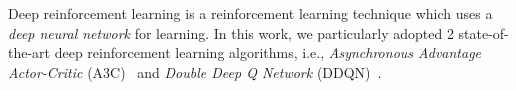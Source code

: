 %
Deep reinforcement learning is a reinforcement learning technique which uses a \emph{deep neural network} for learning.  %
In this work, we particularly adopted 2 state-of-the-art deep reinforcement learning algorithms, i.e., \emph{Asynchronous Advantage Actor-Critic} (A3C)~\cite{Mnih2016} and \emph{Double Deep Q Network} (DDQN)~\cite{pmlr-v48-gu16}.
%
%
%

%
%

%
